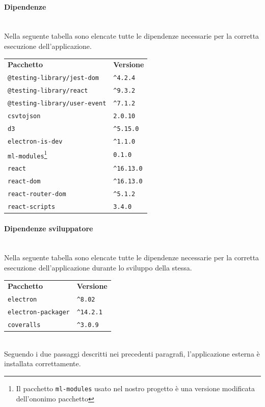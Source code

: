 \paragraph*{Dipendenze}\mbox{}\\ [1mm]
Nella seguente tabella sono elencate tutte le dipendenze necessarie per la corretta esecuzione dell'applicazione.
\mbox{}\\ [1mm]
	\setcounter{table}{0}
	\begin{longtable} {
		>{}p{65mm} 
		>{}p{30mm}
		}
    \rowcolor{gray!50}
    \textbf{Pacchetto} & \textbf{Versione} \TBstrut \\ [2mm]
    \verb|@testing-library/jest-dom| & \verb|^4.2.4|  \TBstrut \\ [2mm]
    \verb|@testing-library/react| & \verb|^9.3.2| \TBstrut \\ [2mm]
    \verb|@testing-library/user-event| & \verb|^7.1.2| \TBstrut \\ [2mm]
    \verb|csvtojson| & \verb|2.0.10| \TBstrut \\ [2mm]
    \verb|d3| & \verb|^5.15.0| \TBstrut \\ [2mm]
    \verb|electron-is-dev| & \verb|^1.1.0| \TBstrut \\ [2mm]
    \verb|ml-modules|\footnote{Il pacchetto \texttt{ml-modules} usato nel nostro progetto è una versione modificata dell'ononimo pacchetto} & \verb|0.1.0| \TBstrut \\ [2mm]
    \verb|react| & \verb|^16.13.0| \TBstrut \\ [2mm]
    \verb|react-dom| & \verb|^16.13.0| \TBstrut \\ [2mm]
    \verb|react-router-dom| & \verb|^5.1.2| \TBstrut \\ [2mm]
    \verb|react-scripts| & \verb|3.4.0| \TBstrut \\ [2mm]
    \end{longtable}
    
\paragraph*{Dipendenze sviluppatore}\mbox{}\\ [1mm]
Nella seguente tabella sono elencate tutte le dipendenze necessarie per la corretta esecuzione dell'applicazione durante lo sviluppo della stessa.
	\setcounter{table}{0}
	\begin{longtable} {
		>{}p{65mm} 
		>{}p{30mm}
		}
    \rowcolor{gray!50}
    \textbf{Pacchetto} & \textbf{Versione} \TBstrut \\ [2mm]
    \verb|electron| & \verb|^8.02| \TBstrut \\ [2mm]
    \verb|electron-packager| & \verb|^14.2.1| \TBstrut \\ [2mm]
    \verb|coveralls| & \verb|^3.0.9| \TBstrut \\ [2mm]
    \end{longtable}
    \mbox{}\\ [1mm]
Seguendo i due passaggi descritti nei precedenti paragrafi, l'applicazione esterna è installata correttamente.

